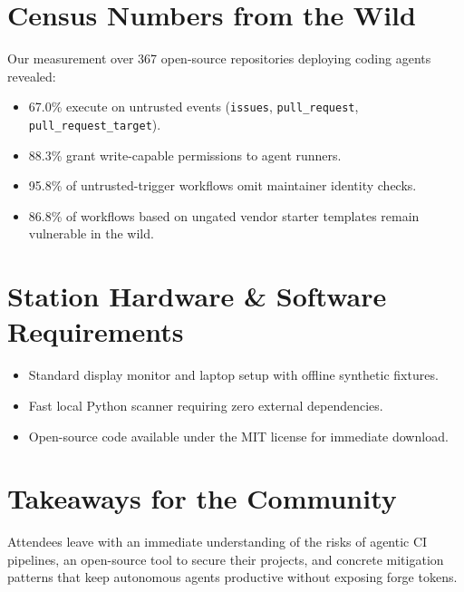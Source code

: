 \documentclass[11pt,a4paper]{article}
\begin{document}
\section{Census Numbers from the Wild}
Our measurement over 367 open-source repositories deploying coding agents revealed:
\begin{itemize}
    \item 67.0\% execute on untrusted events (\texttt{issues}, \texttt{pull\_request}, \texttt{pull\_request\_target}).
    \item 88.3\% grant write-capable permissions to agent runners.
    \item 95.8\% of untrusted-trigger workflows omit maintainer identity checks.
    \item 86.8\% of workflows based on ungated vendor starter templates remain vulnerable in the wild.
\end{itemize}

\section{Station Hardware \& Software Requirements}
\begin{itemize}
    \item Standard display monitor and laptop setup with offline synthetic fixtures.
    \item Fast local Python scanner requiring zero external dependencies.
    \item Open-source code available under the MIT license for immediate download.
\end{itemize}

\section{Takeaways for the Community}
Attendees leave with an immediate understanding of the risks of agentic CI pipelines, an open-source tool to secure their projects, and concrete mitigation patterns that keep autonomous agents productive without exposing forge tokens.
\end{document}

